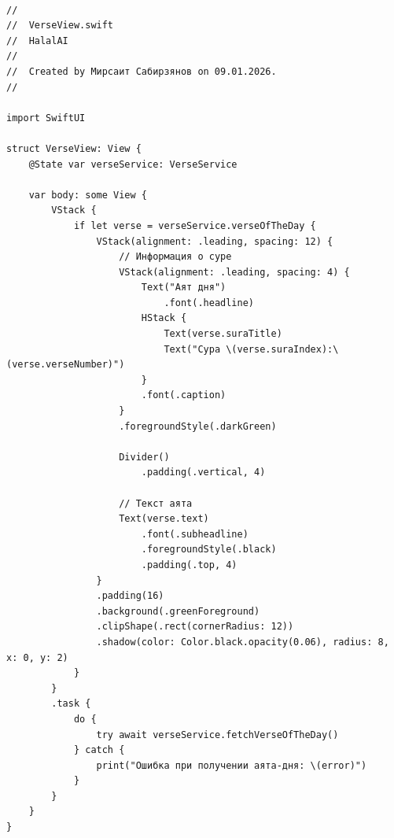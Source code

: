 \begin{lstlisting}[basicstyle=\tiny\ttfamily,breaklines=true]

//
//  VerseView.swift
//  HalalAI
//
//  Created by Мирсаит Сабирзянов on 09.01.2026.
//

import SwiftUI

struct VerseView: View {
    @State var verseService: VerseService

    var body: some View {
        VStack {
            if let verse = verseService.verseOfTheDay {
                VStack(alignment: .leading, spacing: 12) {
                    // Информация о суре
                    VStack(alignment: .leading, spacing: 4) {
                        Text("Аят дня")
                            .font(.headline)
                        HStack {
                            Text(verse.suraTitle)
                            Text("Сура \(verse.suraIndex):\(verse.verseNumber)")
                        }
                        .font(.caption)
                    }
                    .foregroundStyle(.darkGreen)

                    Divider()
                        .padding(.vertical, 4)
                    
                    // Текст аята
                    Text(verse.text)
                        .font(.subheadline)
                        .foregroundStyle(.black)
                        .padding(.top, 4)
                }
                .padding(16)
                .background(.greenForeground)
                .clipShape(.rect(cornerRadius: 12))
                .shadow(color: Color.black.opacity(0.06), radius: 8, x: 0, y: 2)
            }
        }
        .task {
            do {
                try await verseService.fetchVerseOfTheDay()
            } catch {
                print("Ошибка при получении аята-дня: \(error)")
            }
        }
    }
}
\end{lstlisting}

